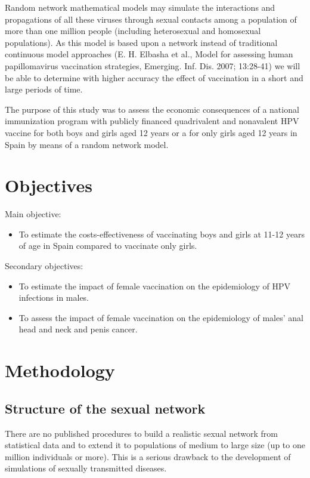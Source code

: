 Random network mathematical models may simulate the interactions and propagations of all these viruses through sexual contacts among a population of more than one million people (including heterosexual and homosexual populations). As this model is based upon a network instead of traditional continuous model approaches (E. H. Elbasha et al., Model for assessing human papillomavirus vaccination strategies,  Emerging. Inf. Dis.  2007; 13:28-41) we will be able to determine with higher accuracy the effect of vaccination in a short and large periods of time.

The purpose of this study was to assess the economic consequences of a national immunization program with publicly financed quadrivalent and nonavalent HPV vaccine for both boys and girls aged 12 years or a for only girls aged 12 years in Spain by means of a random network model. 

\section{Objectives}
Main objective:

\begin{itemize}
	\item To estimate the costs-effectiveness of vaccinating boys and girls at 11-12 years of age in Spain compared to vaccinate only girls.
\end{itemize}

Secondary objectives:
 
\begin{itemize}
	\item To estimate the impact of female vaccination on the epidemiology of HPV infections in males.
	\item To assess the impact of female vaccination on the epidemiology of males' anal head and neck and penis cancer.
\end{itemize}

\section{Methodology}
\subsection{Structure of the sexual network}
There are no published procedures to build a realistic sexual network from statistical data and to extend it to populations of medium to large size (up to one million individuals or more). This is a serious drawback to the development of simulations of sexually transmitted diseases. 

